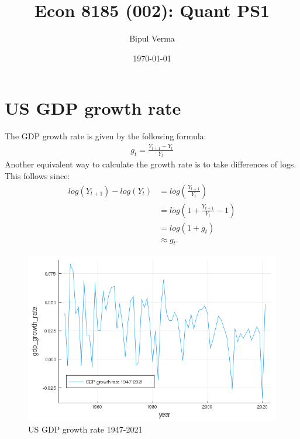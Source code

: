 \documentclass[12pt]{article}
\begin{document}

\title{Econ 8185 (002): Quant PS1}
\author{Bipul Verma}
\date{\today}
\maketitle


\vspace{8cm}



\newpage

\section{US GDP growth rate}
The GDP growth rate is given by the following formula:
\begin{align*}
g_t = \frac{Y_{t+1} - Y_{t}}{Y_t}
\end{align*}
Another equivalent way to calculate the growth rate is to take differences of logs. This follows since:
\begin{align*}
log(Y_{t+1}) - log(Y_t) & = log(\frac{Y_{t+1}}{Y_t})\\
& = log(1 + \frac{Y_{t+1}}{Y_t} -1) \\
& = log(1 + g_t) \\
& \approx g_t.
\end{align*}

\begin{figure}[h]
\centering
\includegraphics[scale=0.5]{gdp_growth.png}
\caption{US GDP growth rate 1947-2021}
\end{figure}
\end{document}
